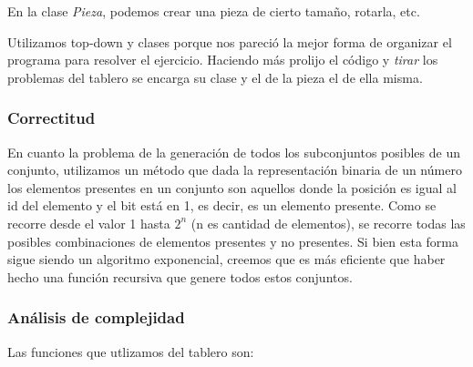 \quad En la clase \textit{Pieza}, podemos crear una pieza de cierto tama\~no, rotarla, etc.

\quad Utilizamos top-down y clases porque nos pareci\'o la mejor forma de organizar el programa para resolver el ejercicio. Haciendo m\'as prolijo el c\'odigo y \textit{tirar} los problemas del tablero se encarga su clase y el de la pieza el de ella misma.



\subsubsection{Correctitud}

\quad En cuanto la problema de la generaci\'on de todos los subconjuntos posibles de un conjunto, utilizamos un m\'etodo que dada la representaci\'on binaria de un n\'umero los elementos presentes en un conjunto son aquellos donde la posici\'on es igual al id del elemento y el bit est\'a en 1, es decir, es un elemento presente. Como se recorre desde el valor 1 hasta $ 2^{n} $ (n es cantidad de elementos), se recorre todas las posibles  combinaciones de elementos presentes y no presentes. Si bien esta forma sigue siendo un algoritmo exponencial, creemos que es m\'as eficiente que haber hecho una funci\'on recursiva que genere todos estos conjuntos.

\subsubsection{An\'alisis de complejidad}

Las funciones que utlizamos del tablero son:

